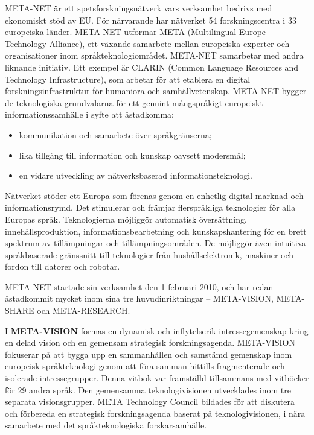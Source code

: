 \begin{multicols}{2}

META-NET är ett spets\-forsk\-nings\-nätverk vars verksamhet bedrivs
med ekonomiskt stöd av EU. För närvarande har nätverket 54 forsk\-nings\-centra i
33 europeiska länder. META-NET utformar META (Multilingual Europe
Technology Alliance), ett växande samarbete mellan europeiska experter
och organisationer inom språkteknologi\-området. META-NET samarbetar
med andra liknande initiativ. Ett exempel är CLARIN (Common Language
Resources and Technology Infrastructure), som arbetar för att etablera
en digital forsknings\-infrastruktur för humaniora och
samhällvetenskap. META-NET bygger de teknologiska grundvalarna för ett
genuint mångspråkigt europeiskt informations\-samhälle i syfte att
åstadkomma:

\begin{itemize}
\item kommunikation och samarbete över språkgränserna;
\item lika tillgång till information och kunskap oavsett modersmål;
\item en vidare utveckling av nätverksbaserad informationsteknologi.
\end{itemize}

Nätverket stöder ett Europa som förenas genom en enhetlig digital marknad och informationsrymd. Det stimulerar och främjar flerspråkliga teknologier för alla Europas språk. Teknologierna möjliggör automatisk översättning, innehållsproduktion, informationsbearbetning och kunskapshantering för en brett spektrum av tillämpningar och tillämpningsområden. De möjliggör även intuitiva språkbaserade gränssnitt till teknologier från hushållselektronik, maskiner och fordon till datorer och robotar.

META-NET startade sin verksamhet den 1 februari 2010, och har redan åstadkommit mycket inom sina tre huvudinriktningar -- META-VISION, META-SHARE och META-RESEARCH.

I \textbf{META-VISION} formas en dynamisk och inflytelserik
intressegemenskap kring en delad vision och en gemensam strategisk
forskningsagenda. META-VISION fokuserar på att bygga upp en
sammanhållen och samstämd gemenskap inom europeisk språkteknologi
genom att föra samman hittills fragmenterade och isolerade
intressegrupper. Denna vitbok var framställd tillsammans med vitböcker för 29 andra språk. Den gemensamma teknologivisionen utvecklades inom tre separata visionsgrupper. META Technology Council bildades för att diskutera och förbereda en strategisk forskningsagenda baserat på teknologivisionen, i nära samarbete med det språkteknologiska forskarsamhälle.


\end{multicols}
